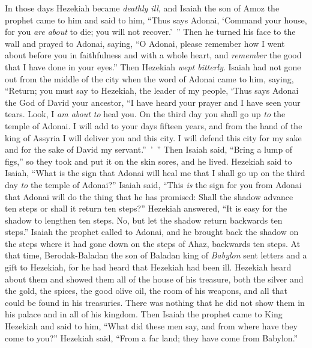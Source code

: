 \begin{biblechapter} %
 In those days Hezekiah became \textit{deathly ill}, and Isaiah the son of Amoz the prophet came to him and said to him, “Thus says Adonai, ‘Command your house, for you \textit{are about} to die; you will not recover.’ ”
\verse Then he turned his face to the wall and prayed to Adonai, saying,
\verse “O Adonai, please remember how I went about before you in faithfulness and with a whole heart, and \textit{remember} the good that I have done in your eyes.” Then Hezekiah \textit{wept bitterly}.
\verse Isaiah had not gone out from the middle of the city when the word of Adonai came to him, saying,
\verse “Return; you must say to Hezekiah, the leader of my people, ‘Thus says Adonai the God of David your ancestor, “I have heard your prayer and I have seen your tears. Look, I \textit{am about to} heal you. On the third day you shall go up \textit{to} the temple of Adonai.
\verse I will add to your days fifteen years, and from the hand of the king of Assyria I will deliver you and this city. I will defend this city for my sake and for the sake of David my servant.” ’ ”
\verse Then Isaiah said, “Bring a lump of figs,” so they took and put it on the skin sores, and he lived.
\verse Hezekiah said to Isaiah, “What is the sign that Adonai will heal me that I shall go up on the third day \textit{to} the temple of Adonai?”
\verse Isaiah said, “This \textit{is} the sign for you from Adonai that Adonai will do the thing that he has promised: Shall the shadow advance ten steps or shall it return ten steps?”
\verse Hezekiah answered, “It is easy for the shadow to lengthen ten steps. No, but let the shadow return backwards ten steps.”
\verse Isaiah the prophet called to Adonai, and he brought back the shadow on the steps where it had gone down on the steps of Ahaz, backwards ten steps.
 At that time, Berodak-Baladan the son of Baladan king of \textit{Babylon} sent letters and a gift to Hezekiah, for he had heard that Hezekiah had been ill.
\verse Hezekiah heard about them and showed them all of the house of his treasure, both the silver and the gold, the spices, the good olive oil, the room of his weapons, and all that could be found in his treasuries. There was nothing that he did not show them in his palace and in all of his kingdom.
\verse Then Isaiah the prophet came to King Hezekiah and said to him, “What did these men say, and from where have they come to you?” Hezekiah said, “From a far land; they have come from Babylon.”

\end{biblechapter}
